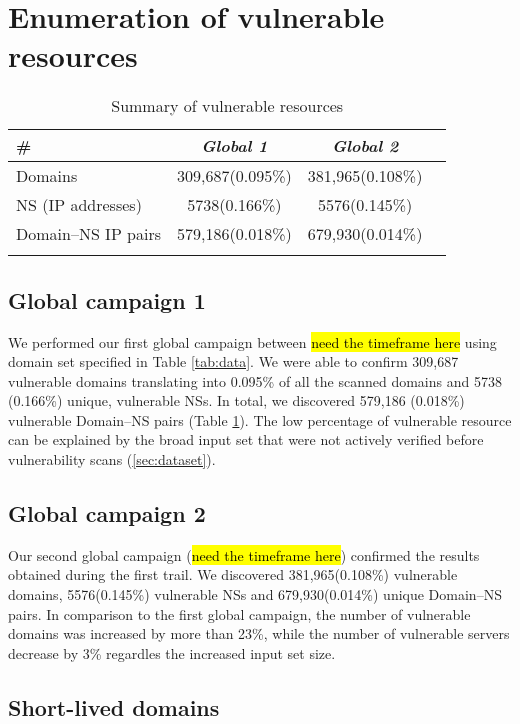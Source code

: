\section{Enumeration of vulnerable resources}

\begin{table}
  \caption{Summary of vulnerable resources \label{tab:vulnerable}}
 \centering
\begin{tabular}{l*{3}{c}}
\Xhline{2\arrayrulewidth}
\#  & \textbf{\textit{Global 1}} & \textbf{\textit{Global 2}} \\
\hline
Domains & 309,687(0.095\%) & 381,965(0.108\%) \\
NS (IP addresses) & 5738(0.166\%) & 5576(0.145\%) \\
Domain--NS IP pairs & 579,186(0.018\%) & 679,930(0.014\%) \\
\Xhline{2\arrayrulewidth}
 \end{tabular}
\end{table}


\subsection{Global campaign 1}
We performed our first global campaign between \hl{need the timeframe here} using domain set specified in Table \ref{tab:data}. We were able to confirm 309,687 vulnerable domains translating into 0.095\% of all the scanned domains and 5738 (0.166\%) unique, vulnerable NSs. In total, we discovered  579,186 (0.018\%) vulnerable Domain--NS pairs (Table \ref{tab:vulnerable}). The low percentage of vulnerable resource can be explained by the broad input set that were not actively verified before vulnerability scans (\ref{sec:dataset}). 

\subsection{Global campaign 2}
Our second global campaign (\hl{need the timeframe here}) confirmed the results obtained during the first trail. We discovered 381,965(0.108\%) vulnerable domains, 5576(0.145\%) vulnerable NSs and 679,930(0.014\%) unique Domain--NS pairs. In comparison to the first global campaign, the number of vulnerable domains was increased by more than 23\%, while the number of vulnerable servers decrease by 3\% regardles the increased input set size. 


\subsection{Short-lived domains}


